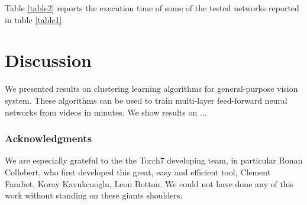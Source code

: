 \documentclass{article} %
\begin{document}
%

Table \ref{table2} reports the execution time of some of the tested networks reported in table \ref{table1}.



\section{Discussion}

We presented results on clustering learning algorithms for general-purpose vision system. These algorithms can be used to train multi-layer feed-forward neural networks from videos in minutes. We show results on ...



%


\subsubsection*{Acknowledgments}
We are especially grateful to the the Torch7 developing team, in particular Ronan Collobert, who first developed this great, easy and efficient tool, Clement Farabet, Koray Kavukcuoglu, Leon Bottou. We could not have done any of this work without standing on these giants shoulders.



\end{document}
